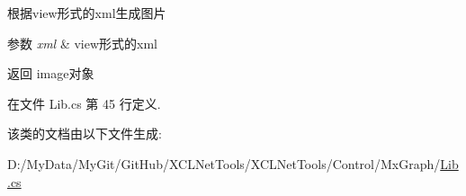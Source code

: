 根据view形式的xml生成图片 


\begin{DoxyParams}{参数}
{\em xml} & view形式的xml\\
\hline
\end{DoxyParams}
\begin{DoxyReturn}{返回}
image对象
\end{DoxyReturn}


在文件 Lib.\-cs 第 45 行定义.



该类的文档由以下文件生成\-:\begin{DoxyCompactItemize}
\item 
D\-:/\-My\-Data/\-My\-Git/\-Git\-Hub/\-X\-C\-L\-Net\-Tools/\-X\-C\-L\-Net\-Tools/\-Control/\-Mx\-Graph/\hyperlink{_control_2_mx_graph_2_lib_8cs}{Lib.\-cs}\end{DoxyCompactItemize}
